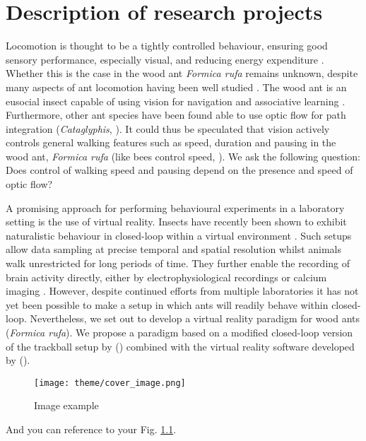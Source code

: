 \chapter{Description of research projects}
\label{chap:rationale}

Locomotion is thought to be a tightly controlled behaviour, ensuring good sensory performance, especially visual, and reducing energy expenditure \autocites{Benichou2011IntermittentStrategies, Kramer2001}. Whether this is the case in the wood ant \textit{Formica rufa} remains unknown, despite many aspects of ant locomotion having been well studied \autocites{Lipp2005, Wahl2015}. The wood ant is an eusocial insect capable of using vision for navigation \autocite{Harris2007} and associative learning \autocite{Fernandes2017a}. Furthermore, other ant species have been found able to use optic flow for path integration (\textit{Cataglyphis}, \citealt{Ronacher1995, Pfeffer2016}). It could thus be speculated that vision actively controls general walking features such as speed, duration and pausing in the wood ant, \textit{Formica rufa} (like bees control speed, \cite{Schone1996, Linander2015}). We ask the following question: Does control of walking speed and pausing depend on the presence and speed of optic flow?

A promising approach for performing behavioural experiments in a laboratory setting is the use of virtual reality. Insects have recently been shown to exhibit naturalistic behaviour in closed-loop within a virtual environment \autocites{Takalo2012, Buatois2017, Seelig2010}. Such setups allow data sampling at precise temporal and spatial resolution whilst animals walk unrestricted for long periods of time. They further enable the recording of brain activity directly, either by electrophysiological recordings or calcium imaging \autocite{Seelig2010}. However, despite continued efforts from multiple laboratories it has not yet been possible to make a setup in which ants will readily behave within closed-loop. Nevertheless, we set out to develop a virtual reality paradigm for wood ants (\textit{Formica rufa}). We propose a paradigm based on a modified closed-loop version of the trackball setup by \citeauthor{Dahmen2017} (\citeyear{Dahmen2017}) combined with the virtual reality software developed by \citeauthor{Aronov2014b} (\citeyear{Aronov2014b}).

\begin{figure}[h]
    \centering
    \texttt{[image: theme/cover\_image.png]}
    \caption{Image example}
    \label{fig:image_example}
\end{figure}

And you can reference to your Fig. \ref{fig:image_example}.